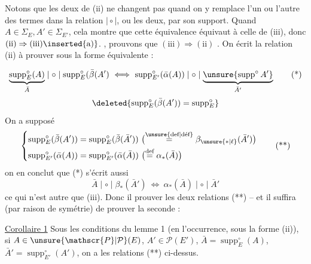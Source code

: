 Notons que les deux  de (ii) ne changent pas quand on y remplace l'un ou l'autre des termes dans la relation $\mid\circ\mid$, ou les deux, par son support. Quand $A\in\Sigma_E,A'\in\Sigma_{E'}$, cela montre que cette équivalence  équivaut à celle de (iii), donc $(\mathrm{ii})\Rightarrow(\mathrm{iii})\inserted{\text{a)}}$.  , prouvons que $(\mathrm{iii})\Rightarrow(\mathrm{ii})$ . On écrit la relation (ii) à prouver sous la forme équivalente :


\[
\underbrace{\operatorname{supp}^{\circ}_E(A)}_{\bar A}\mid\circ\mid\operatorname{supp}^{\circ}_E(\bar\beta(A')\ \Longleftrightarrow\ \operatorname{supp}^{\circ}_{E'}(\bar\alpha(A))\mid\circ\mid\underbrace{\unsure{\operatorname{supp}^{\circ}A'}}_{\bar A'}
\tag*{(*)}
\]
\[
\deleted{\operatorname{supp}^{\circ}_E(\bar\beta(A'))=\operatorname{supp}^{\circ}_E}
\]
 On a supposé
\[
\left\{
\begin{aligned}
\operatorname{supp}^{\circ}_E(\bar\beta(A'))&=\operatorname{supp}^{\circ}_E(\bar\beta(\bar A'))\ \bigl(\overset{\text{\unsure{def|déf}}}=\beta_{\unsure{*|\ell}}(\bar A')\bigr)\\
\operatorname{supp}^{\circ}_{E'}(\bar\alpha(A))&=\operatorname{supp}^{\circ}_{E'}(\bar\alpha(\bar A))\ \bigl(\overset{\text{def}}=\alpha_*(\bar A)\bigr)
\end{aligned}
\right.
\tag*{(**)}
\]
on en conclut que (*) s'écrit aussi
\[
\bar A\mid\circ\mid\beta_*(\bar A')\ \Longleftrightarrow\ \alpha_*(\bar A)\mid\circ\mid\bar A'
\]
ce qui n'est autre que (iii).
Donc il  prouver  les deux relations (**) -- et il suffira  (par raison de symétrie) de prouver la seconde :

\uline{Corollaire 1} Sous les conditions du lemme 1 (en l'occurrence, sous la forme (ii)), si $A\in\unsure{\mathscr{P}|\mathcal{P}}(E)$, $A'\in\mathscr{P}(E')$, $\bar A=\operatorname{supp}^{\circ}_E(A)$, $\bar A'=\operatorname{supp}^{\circ}_{E'}(A')$, on a les relations (**) ci-dessus.


